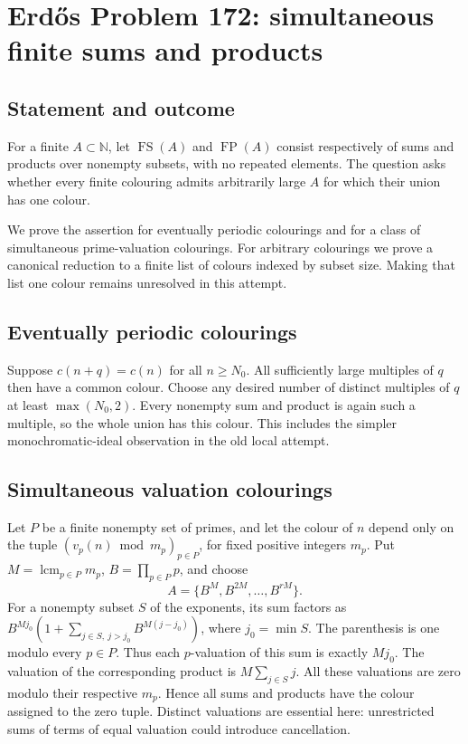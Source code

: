 \section*{Erd\H{o}s Problem 172: simultaneous finite sums and products}
\subsection*{Statement and outcome}
For a finite $A\subset\mathbb N$, let $\operatorname{FS}(A)$ and
$\operatorname{FP}(A)$ consist respectively of sums and products over nonempty subsets, with no repeated elements. The question asks whether every finite colouring admits arbitrarily large $A$ for which their union has one colour.

We prove the assertion for eventually periodic colourings and for a class of simultaneous prime-valuation colourings. For arbitrary colourings we prove a canonical reduction to a finite list of colours indexed by subset size. Making that list one colour remains unresolved in this attempt.

\subsection*{Eventually periodic colourings}
Suppose $c(n+q)=c(n)$ for all $n\ge N_0$. All sufficiently large multiples of $q$ then have a common colour. Choose any desired number of distinct multiples of $q$ at least $\max(N_0,2)$. Every nonempty sum and product is again such a multiple, so the whole union has this colour. This includes the simpler monochromatic-ideal observation in the old local attempt.

\subsection*{Simultaneous valuation colourings}
Let $P$ be a finite nonempty set of primes, and let the colour of $n$ depend only on the tuple
$(v_p(n)\bmod m_p)_{p\in P}$, for fixed positive integers $m_p$.
Put $M=\operatorname{lcm}_{p\in P}m_p$, $B=\prod_{p\in P}p$, and choose
\[
 A=\{B^{M},B^{2M},\ldots,B^{rM}\}.
\]
For a nonempty subset $S$ of the exponents, its sum factors as
$B^{Mj_0}(1+\sum_{j\in S,\ j>j_0}B^{M(j-j_0)})$,
where $j_0=\min S$. The parenthesis is one modulo every $p\in P$.
Thus each $p$-valuation of this sum is exactly $Mj_0$.
The valuation of the corresponding product is $M\sum_{j\in S}j$.
All these valuations are zero modulo their respective $m_p$.
Hence all sums and products have the colour assigned to the zero tuple.
Distinct valuations are essential here: unrestricted sums of terms of equal valuation could introduce cancellation.

